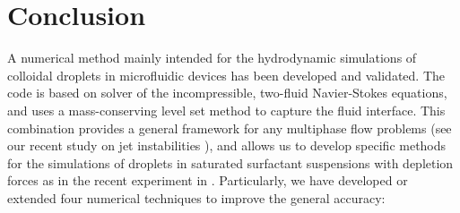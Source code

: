 \begin{figure}[t]
\centering
  \caption{}
  \label{fig: clusters}
\end{figure}




\section{Conclusion}
\label{sec: conclusion}


A numerical method mainly intended for the hydrodynamic simulations of colloidal droplets in microfluidic devices has been developed and validated. The code is based on  solver of the incompressible, two-fluid Navier-Stokes equations, and uses a mass-conserving level set method to capture the fluid interface. This combination provides a general framework for any multiphase flow problems (see \eg our recent study on jet instabilities \citep{Loiseau_PRF_2016}), and allows us to develop specific methods for the simulations of droplets in saturated surfactant suspensions with depletion forces as in the recent experiment in \cite{Shen_AS_2016}. Particularly, we have developed or extended four numerical techniques to improve the general accuracy:

